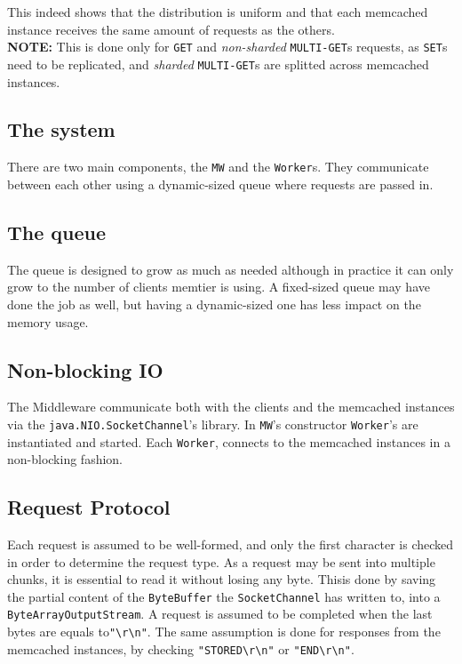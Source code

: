 \documentclass[11pt,a4paper]{article}
\begin{document}
This indeed shows that the distribution is uniform and that each memcached instance receives the same amount of requests as the others.\\\textbf{NOTE:} This is done only for \texttt{GET} and \textit{non-sharded} \texttt{MULTI-GET}s requests, as \texttt{SET}s need to be replicated, and \textit{sharded} \texttt{MULTI-GET}s are splitted across memcached instances. 

\subsection{The system}

There are two main components, the \texttt{MW} and the \texttt{Worker}s. They communicate between each other using a dynamic-sized queue where requests are passed in.

\subsection{The queue}

The queue is designed to grow as much as needed although in practice it can only grow to the number of clients memtier is using. A fixed-sized queue may have done the job as well, but having a dynamic-sized one has less impact on the memory usage.

\subsection{Non-blocking IO}

The Middleware communicate both with the clients and the memcached instances via the \texttt{java.NIO.SocketChannel}'s library. In \texttt{MW}'s constructor \texttt{Worker}'s are instantiated and started. Each \texttt{Worker}, connects to the memcached instances in a non-blocking fashion.

\subsection{Request Protocol}

Each request is assumed to be well-formed, and only the first character is checked in order to determine the request type. As a request may be sent into multiple chunks, it is essential to read it without losing any byte. Thisis done by saving the partial content of the \texttt{ByteBuffer} the \texttt{SocketChannel} has written to, into a \texttt{ByteArrayOutputStream}. A request is assumed to be completed when the last bytes are equals to\texttt{"\textbackslash{}r\textbackslash{}n"}. The same assumption is done for responses from the memcached instances, by checking \texttt{"STORED\textbackslash{}r\textbackslash{}n"} or \texttt{"END\textbackslash{}r\textbackslash{}n"}.
\end{document}
